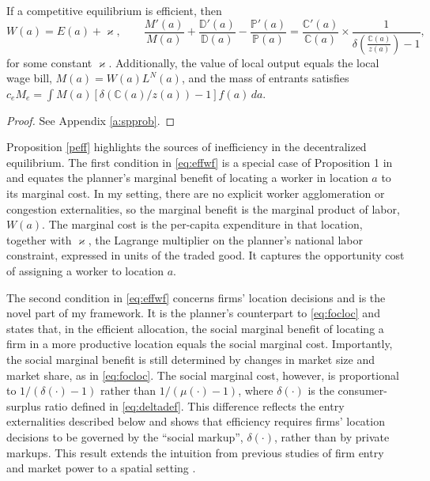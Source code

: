 \begin{prop}\label{peff}
    If a competitive equilibrium is efficient, then
	\begin{equation}\label{eq:effwf}
		W(a) = E(a) +\varkappa, \qquad \frac{M'(a)}{M(a)} + \frac{\mathbb{D}'(a)}{\mathbb{D}(a)} - \frac{\mathbb{P}'(a)}{\mathbb{P}(a)} = \frac{\mathbb{C}' (a)}{\mathbb{C}(a)} \times \frac{1}{\delta\left(\frac{\mathbb{C}(a)}{z(a)}\right) - 1}, 
	\end{equation}
for some constant $\varkappa$. Additionally, the value of local output equals the local wage bill, $M(a) = W(a)L^N(a)$, and the mass of entrants satisfies $c_e M_e=\int M(a)\left[\delta\left(\mathbb{C}(a)/z(a)\right)-1\right]f(a)\,da$.
\end{prop}

\begin{proof}
	See Appendix \ref{a:spprob}.
\end{proof}

Proposition \ref{peff} highlights the sources of inefficiency in the decentralized equilibrium. The first condition in \eqref{eq:effwf} is a special case of Proposition 1 in \textcite{Fajgelbaum&Gaubert20} and equates the planner’s marginal benefit of locating a worker in location $a$ to its marginal cost. In my setting, there are no explicit worker agglomeration or congestion externalities, so the marginal benefit is the marginal product of labor, $W(a)$. The marginal cost is the per-capita expenditure in that location, together with $\varkappa$, the Lagrange multiplier on the planner’s national labor constraint, expressed in units of the traded good. It captures the opportunity cost of assigning a worker to location $a$.

The second condition in \eqref{eq:effwf} concerns firms’ location decisions and is the novel part of my framework. It is the planner’s counterpart to \eqref{eq:focloc} and states that, in the efficient allocation, the social marginal benefit of locating a firm in a more productive location equals the social marginal cost. Importantly, the social marginal benefit is still determined by changes in market size and market share, as in \eqref{eq:focloc}. The social marginal cost, however, is proportional to $1/(\delta(\cdot)-1)$ rather than $1/(\mu(\cdot)-1)$, where $\delta(\cdot)$ is the consumer-surplus ratio defined in \eqref{eq:deltadef}. This difference reflects the entry externalities described below and shows that efficiency requires firms’ location decisions to be governed by the ``social markup'', $\delta(\cdot)$, rather than by private markups. This result extends the intuition from previous studies of firm entry and market power to a spatial setting \parencite{Zhelobodkoetal12,BilbiieGhironi&Melitz19,Dhingra&Morrow19,BaqaeeFarhi&Sangani23,EdmondMidrigan&Xu23}.

